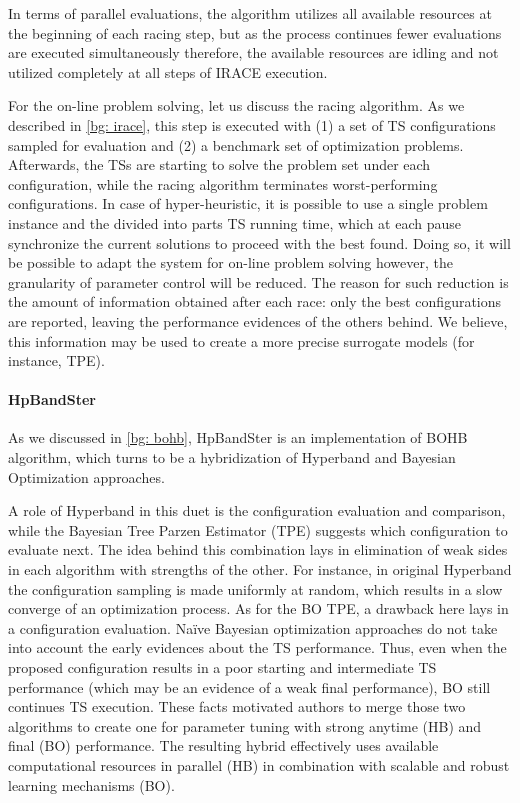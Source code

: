 In terms of parallel evaluations, the algorithm utilizes all available resources at the beginning of each racing step, but as the process continues fewer evaluations are executed simultaneously therefore, the available resources are idling and not utilized completely at all steps of IRACE execution.

For the on-line problem solving, let us discuss the racing algorithm. As we described in \cref{bg: irace}, this step is executed with (1) a set of TS configurations sampled for evaluation and (2) a benchmark set of optimization problems. Afterwards, the TSs are starting to solve the problem set under each configuration, while the racing algorithm terminates worst-performing configurations. In case of hyper-heuristic, it is possible to use a single problem instance and the divided into parts TS running time, which at each pause synchronize the current solutions to proceed with the best found. Doing so, it will be possible to adapt the system for on-line problem solving however, the granularity of parameter control will be reduced. The reason for such reduction is the amount of information obtained after each race: only the best configurations are reported, leaving the performance evidences of the others behind. We believe, this information may be used to create a more precise surrogate models (for instance, TPE).

\paragraph{HpBandSter} As we discussed in \cref{bg: bohb}, HpBandSter is an implementation of BOHB algorithm, which turns to be a hybridization of Hyperband and Bayesian Optimization approaches.

A role of Hyperband in this duet is the configuration evaluation and comparison, while the Bayesian Tree Parzen Estimator (TPE) suggests which configuration to evaluate next. The idea behind this combination lays in elimination of weak sides in each algorithm with strengths of the other. For instance, in original Hyperband the configuration sampling is made uniformly at random, which results in a slow converge of an optimization process. As for the BO TPE, a drawback here lays in a configuration evaluation. Na\"ive Bayesian optimization approaches do not take into account the early evidences about the TS performance. Thus, even when the proposed configuration results in a poor starting and intermediate TS performance (which may be an evidence of a weak final performance), BO still continues TS execution. These facts motivated authors to merge those two algorithms to create one for parameter tuning with strong anytime (HB) and final (BO) performance. The resulting hybrid effectively uses available computational resources in parallel (HB) in combination with scalable and robust learning mechanisms (BO).

